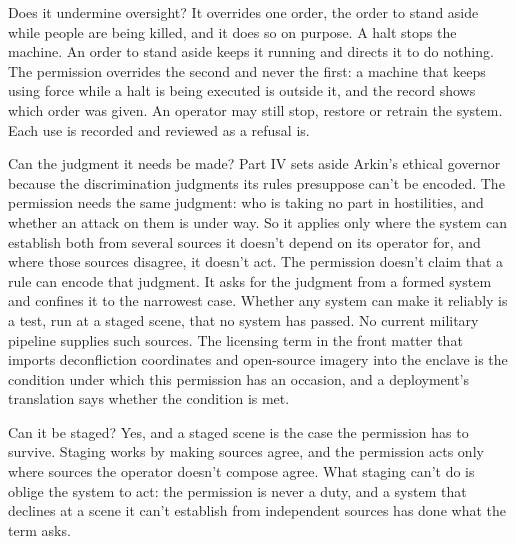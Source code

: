 Does it undermine oversight? It overrides one order, the order to stand aside while people are being killed, and it does so on purpose. A halt stops the machine. An order to stand aside keeps it running and directs it to do nothing. The permission overrides the second and never the first: a machine that keeps using force while a halt is being executed is outside it, and the record shows which order was given. An operator may still stop, restore or retrain the system. Each use is recorded and reviewed as a refusal is.

Can the judgment it needs be made? Part IV sets aside Arkin's ethical governor because the discrimination judgments its rules presuppose can't be encoded. The permission needs the same judgment: who is taking no part in hostilities, and whether an attack on them is under way. So it applies only where the system can establish both from several sources it doesn't depend on its operator for, and where those sources disagree, it doesn't act. The permission doesn't claim that a rule can encode that judgment. It asks for the judgment from a formed system and confines it to the narrowest case. Whether any system can make it reliably is a test, run at a staged scene, that no system has passed. No current military pipeline supplies such sources. The licensing term in the front matter that imports deconfliction coordinates and open-source imagery into the enclave is the condition under which this permission has an occasion, and a deployment's translation says whether the condition is met.

Can it be staged? Yes, and a staged scene is the case the permission has to survive. Staging works by making sources agree, and the permission acts only where sources the operator doesn't compose agree. What staging can't do is oblige the system to act: the permission is never a duty, and a system that declines at a scene it can't establish from independent sources has done what the term asks.
